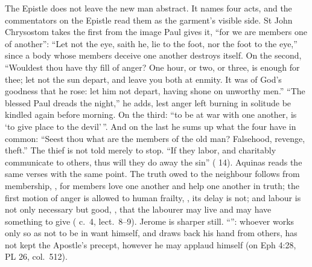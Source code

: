 The Epistle does not leave the new man abstract. It names four acts, and the
commentators on the Epistle read them as the garment's visible side. St John
Chrysostom takes the first from the image Paul gives it, ``for we are members
one of another'': ``Let not the eye, saith he, lie to the foot, nor the foot to
the eye,'' since a body whose members deceive one another destroys itself.
On the second, ``Wouldest thou have thy fill of anger? One hour, or two, or
three, is enough for thee; let not the sun depart, and leave you both at
enmity. It was of God's goodness that he rose: let him not depart, having shone
on unworthy men.'' ``The blessed Paul dreads the night,'' he adds, lest anger
left burning in solitude be kindled again before morning. On the third: ``to be
at war with one another, is `to give place to the devil'\,''. And on the last he
sums up what the four have in common: ``Seest thou what are the members of the
old man? Falsehood, revenge, theft.'' The thief is not told merely to stop.
``If they labor, and charitably communicate to others, thus will they do away
the sin'' ( 14). Aquinas reads the same verses with
the same point. The truth owed to the neighbour follows from membership,
, for
members love one another and help one another in truth; the first motion of
anger is allowed to human frailty, , its delay is
not; and labour is not only necessary but good, , that the labourer
may live and may have something to give (
c.~4, lect.~8--9). Jerome is sharper still. ``'': whoever works only so as not to
be in want himself, and draws back his hand from others, has not kept the
Apostle's precept, however he may applaud himself (on Eph 4:28, PL 26,
col.~512).

